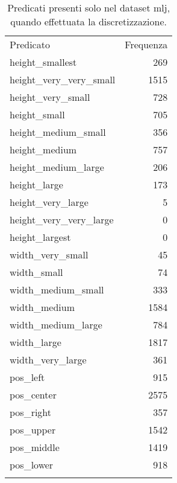 \begin{table}[h!tbp]
\centering
\label{tab:frequenzaPredicat}
\small\begin{tabular}{lr}
\toprule
\addlinespace
Predicato & Frequenza \\
\addlinespace
\midrule
\addlinespace
height\_smallest & 269 \\
height\_very\_very\_small & 1515 \\
height\_very\_small & 728 \\
height\_small & 705 \\
height\_medium\_small & 356 \\
height\_medium & 757 \\
height\_medium\_large & 206 \\
height\_large & 173 \\
height\_very\_large & 5 \\
height\_very\_very\_large & 0 \\
height\_largest & 0 \\
width\_very\_small & 45 \\
width\_small & 74 \\
width\_medium\_small & 333 \\
width\_medium & 1584 \\
width\_medium\_large & 784 \\
width\_large & 1817 \\
width\_very\_large & 361 \\
pos\_left & 915 \\
pos\_center & 2575 \\
pos\_right & 357 \\
pos\_upper & 1542 \\
pos\_middle & 1419 \\
pos\_lower & 918 \\
\addlinespace
\bottomrule
\end{tabular}
\caption{Predicati presenti solo nel dataset mlj, quando effettuata la discretizzazione.}
\end{table}